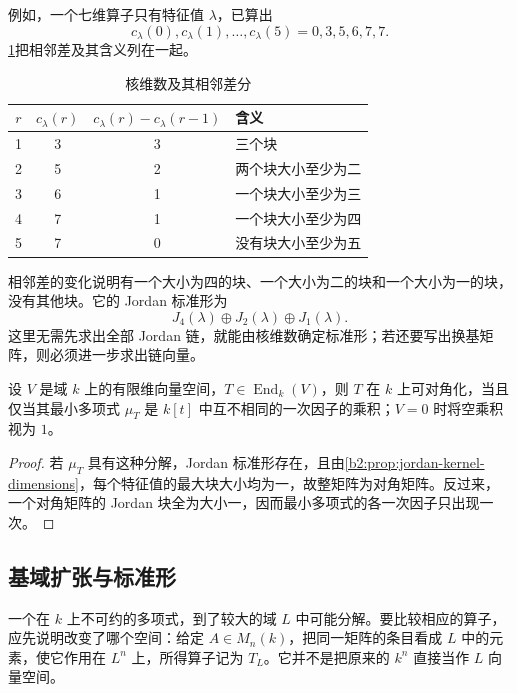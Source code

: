 例如，一个七维算子只有特征值 \(\lambda\)，已算出
\[
	c_\lambda(0),c_\lambda(1),\ldots,c_\lambda(5) =0,3,5,6,7,7.
\]
\cref{b2:tab:jordan-kernel-differences}把相邻差及其含义列在一起。
\begin{table}[htbp]
	\centering
	\caption[核维数与 Jordan 块]{核维数及其相邻差分}
	\label{b2:tab:jordan-kernel-differences}
	\begin{tabular}{@{}ccc l@{}}
		\toprule
		\(r\) & \(c_\lambda(r)\) & \(c_\lambda(r)-c_\lambda(r-1)\) & 含义 \\
		\midrule
		1 & 3 & 3 & 三个块 \\
		2 & 5 & 2 & 两个块大小至少为二 \\
		3 & 6 & 1 & 一个块大小至少为三 \\
		4 & 7 & 1 & 一个块大小至少为四 \\
		5 & 7 & 0 & 没有块大小至少为五 \\
		\bottomrule
	\end{tabular}
\end{table}
相邻差的变化说明有一个大小为四的块、一个大小为二的块和一个大小为一的块，没有其他块。它的 Jordan 标准形为
\[
	J_4(\lambda)\oplus J_2(\lambda)\oplus J_1(\lambda).
\]
这里无需先求出全部 Jordan 链，就能由核维数确定标准形；若还要写出换基矩阵，则必须进一步求出链向量。

\begin{corollary}\label{b2:cor:jordan-diagonalizable}
	设 \(V\) 是域 \(k\) 上的有限维向量空间，\(T\in\operatorname{End}_k(V)\)，则 \(T\) 在 \(k\) 上可对角化，当且仅当其最小多项式 \(\mu_T\) 是 \(k[t]\) 中互不相同的一次因子的乘积；\(V=0\) 时将空乘积视为 \(1\)。
\end{corollary}
\begin{proof}
	若 \(\mu_T\) 具有这种分解，Jordan 标准形存在，且由\cref{b2:prop:jordan-kernel-dimensions}，每个特征值的最大块大小均为一，故整矩阵为对角矩阵。反过来，一个对角矩阵的 Jordan 块全为大小一，因而最小多项式的各一次因子只出现一次。
\end{proof}

\subsection{基域扩张与标准形}
\label{b2:subsec:0405:03}

一个在 \(k\) 上不可约的多项式，到了较大的域 \(L\) 中可能分解。要比较相应的算子，应先说明改变了哪个空间：给定 \(A\in M_n(k)\)，把同一矩阵的条目看成 \(L\) 中的元素，使它作用在 \(L^n\) 上，所得算子记为 \(T_L\)。它并不是把原来的 \(k^n\) 直接当作 \(L\) 向量空间。

